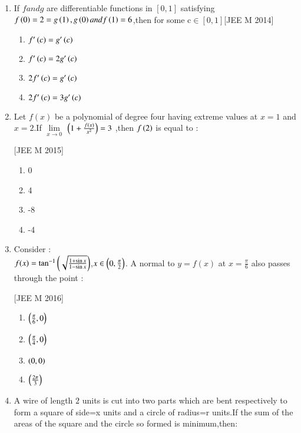 \documentclass[journal,12pt,twocolumn]{IEEEtran}
\theoremstyle{remark}
\begin{document}
\begin{enumerate}
\begin{enumerate}
\end{enumerate}

\item If $f and g$ are differentiable functions in ${[0,1]}$ satisfying $f\left(0\right)=2=g\left(1\right),g\left(0\right) and f\left(1\right)=6$,then for some c$\in {[0,1]}$\hfill[JEE M 2014]
\begin{enumerate}
    \item  $f'\left(c\right)=g'\left(c\right)$\\
    \item  $f'\left(c\right)=2g'\left(c\right)$\\
    \item  $2f'\left(c\right)=g'\left(c\right)$\\
    \item  $2f'\left(c\right)=3g'\left(c\right)$\\
\end{enumerate}
\item Let $f(x)$ be a polynomial of degree four having extreme values at $x=1$ and $x=2$.If $\lim\limits_{x\to 0}$ $\left(1+\frac{f(x)}{x^{2}}\right)=3$ ,then $f\left(2\right)$ is equal to :

    \hfill[JEE M 2015]\\
\begin{enumerate}
    \item  0\\
    \item  4\\
    \item -8\\
    \item -4\\
\end{enumerate}    
\item Consider $:$\\
     $f(x)=\tan^{-1}\left( \sqrt{\frac{1+\sin{x}}{1-\sin{x}} }\right)$,$x \in \left(0,\frac{\pi}{2}\right)$.
A normal to $y=f(x)$ at $x=\frac{\pi}{6}$ also passes through the point :

\hfill[JEE M 2016]\\
\begin{enumerate}
    \item  $\left(\frac{\pi}{6},0\right)$\\
    \item  $\left(\frac{\pi}{4},0\right)$\\
    \item  $\left(0,0\right)$\\
    \item  $\left(\frac{2\pi}{3}\right)$\\
\end{enumerate}
\item A wire of length $2$ units is cut into two parts which are bent respectively to form a square of side=x units and a circle of radius=r units.If the sum of the areas of the square and the circle so formed is minimum,then$:$


\end{enumerate}
\end{document}

